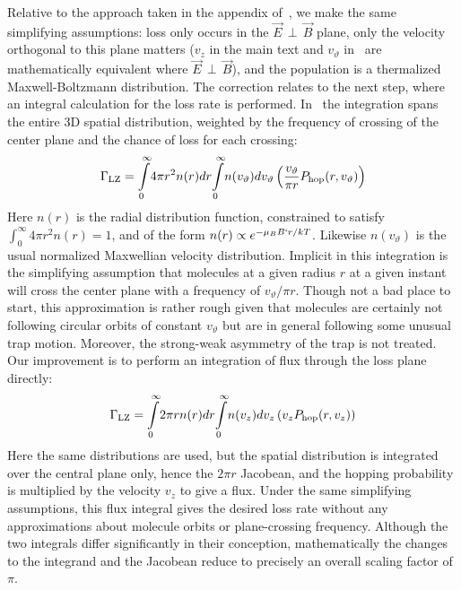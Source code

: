 \documentclass[%
 reprint,
 amsmath,amssymb,
 aps,
prl,
]{revtex4-1}
\newcommand{\epb}{{$\vec{E}\,{\perp}\,\vec{B}$}}
\begin{document}
Relative to the approach taken in the appendix of~\cite{Stuhl2013}, we make the same simplifying assumptions: loss only occurs in the \epb{} plane, only the velocity orthogonal to this plane matters ($v_z$ in the main text and $v_\vartheta$ in~\cite{Stuhl2013} are mathematically equivalent where \epb{}), and the population is a thermalized Maxwell-Boltzmann distribution.
The correction relates to the next step, where an integral calculation for the loss rate is performed.
In~\cite{Stuhl2013} the integration spans the entire 3D spatial distribution, weighted by the frequency of crossing of the center plane and the chance of loss for each crossing:
\begin{equation}
\Gamma_\text{LZ}=\int\displaylimits_0^\infty\!4\pi r^2n(r)dr\!\int\displaylimits_0^\infty \!n(v_\vartheta)dv_\vartheta\left( \frac{v_\vartheta}{\pi r} P_\text{hop}(r,v_\vartheta)\right)
\end{equation}
Here $n(r)$ is the radial distribution function, constrained to satisfy $\int_0^\infty 4\pi r^2n(r)=1$, and of the form $n(r)\propto e^{-\mu_BB`r/kT}$. 
Likewise $n(v_\vartheta)$ is the usual normalized Maxwellian velocity distribution. 
Implicit in this integration is the simplifying assumption that molecules at a given radius $r$ at a given instant will cross the center plane with a frequency of $v_\vartheta/\pi r$.
Though not a bad place to start, this approximation is rather rough given that molecules are certainly not following circular orbits of constant $v_\vartheta$ but are in general following some unusual trap motion.
Moreover, the strong-weak asymmetry of the trap is not treated.
Our improvement is to perform an integration of flux through the loss plane directly:
\begin{equation}
\Gamma_\text{LZ}=\int\displaylimits_0^\infty\!2\pi r n(r)dr\!\int\displaylimits_0^\infty\! n(v_z)dv_z\left(v_z P_\text{hop}(r,v_z)\right)
\end{equation}
Here the same distributions are used, but the spatial distribution is integrated over the central plane only, hence the $2\pi r$ Jacobean, and the hopping probability is multiplied by the velocity $v_z$ to give a flux.
Under the same simplifying assumptions, this flux integral gives the desired loss rate without any approximations about molecule orbits or plane-crossing frequency.
Although the two integrals differ significantly in their conception, mathematically the changes to the integrand and the Jacobean reduce to precisely an overall scaling factor of $\pi$.
\end{document}

